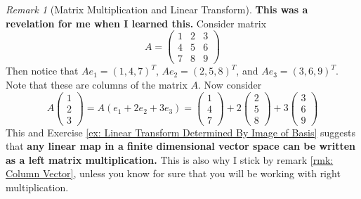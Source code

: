 \documentclass[12pt, a4paper]{article}
\theoremstyle{remark}
\newtheorem{remark}{Remark}
\theoremstyle{definition}
\numberwithin{equation}{section}
\numberwithin{definition}{section}
\numberwithin{example}{section}
\numberwithin{exercise}{section}
\numberwithin{remark}{section}
\numberwithin{figure}{section}
\begin{document}
\begin{remark}[Matrix Multiplication and Linear Transform]
    \textbf{This was a revelation for me when I learned this.}
    Consider matrix
    \begin{equation*}
        A =
        \begin{pmatrix}
            1 & 2 & 3 \\
            4 & 5 & 6 \\
            7 & 8 & 9
        \end{pmatrix}
    \end{equation*}
    Then notice that $Ae_1 = \left( 1,4,7 \right)^T$,
    $Ae_2 = \left( 2,5,8 \right)^T$,
    and $Ae_3 = \left( 3,6,9 \right)^T$.
    Note that these are columns of the matrix $A$.
    Now consider
    \begin{equation*}
        A
        \begin{pmatrix}
            1 \\ 2 \\ 3
        \end{pmatrix}
        = A \left( e_1 + 2 e_2 + 3 e_3 \right)
        =
        \begin{pmatrix}
            1 \\ 4 \\ 7
        \end{pmatrix}
        +
        2
        \begin{pmatrix}
            2 \\ 5 \\ 8
        \end{pmatrix}
        +
        3
        \begin{pmatrix}
            3 \\ 6 \\ 9
        \end{pmatrix}
    \end{equation*}
    This and Exercise \ref{ex: Linear Transform Determined By Image of Basis} suggests that
    \textbf{any linear map in a finite dimensional vector space can be written as a left matrix multiplication.}
    This is also why I stick by remark \ref{rmk: Column Vector},
    unless you know for sure that you will be working with right multiplication.
\end{remark}
\end{document}
